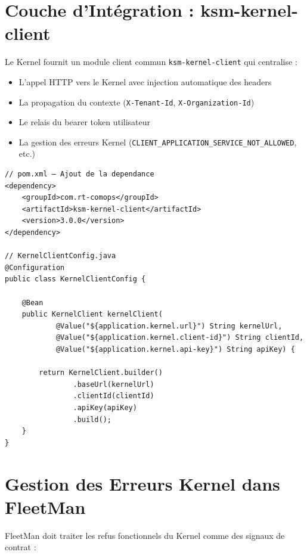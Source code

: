 \documentclass[12pt,a4paper]{report}
\begin{document}
\section{Couche d'Intégration : ksm-kernel-client}

Le Kernel fournit un module client commun \texttt{ksm-kernel-client} qui centralise :

\begin{itemize}[leftmargin=2cm]
  \item L'appel HTTP vers le Kernel avec injection automatique des headers
  \item La propagation du contexte (\texttt{X-Tenant-Id}, \texttt{X-Organization-Id})
  \item Le relais du bearer token utilisateur
  \item La gestion des erreurs Kernel (\texttt{CLIENT\_APPLICATION\_SERVICE\_NOT\_ALLOWED}, etc.)
\end{itemize}

\begin{lstlisting}[style=javaStyle, caption={Configuration du ksm-kernel-client dans FleetMan}]
// pom.xml — Ajout de la dependance
<dependency>
    <groupId>com.rt-comops</groupId>
    <artifactId>ksm-kernel-client</artifactId>
    <version>3.0.0</version>
</dependency>

// KernelClientConfig.java
@Configuration
public class KernelClientConfig {

    @Bean
    public KernelClient kernelClient(
            @Value("${application.kernel.url}") String kernelUrl,
            @Value("${application.kernel.client-id}") String clientId,
            @Value("${application.kernel.api-key}") String apiKey) {

        return KernelClient.builder()
                .baseUrl(kernelUrl)
                .clientId(clientId)
                .apiKey(apiKey)
                .build();
    }
}
\end{lstlisting}

\section{Gestion des Erreurs Kernel dans FleetMan}

FleetMan doit traiter les refus fonctionnels du Kernel comme des signaux de contrat :
\end{document}
